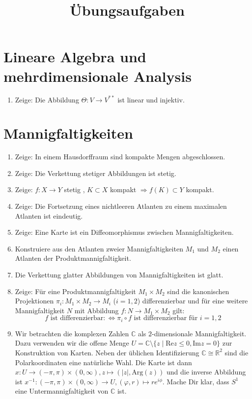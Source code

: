 \documentclass[a4paper]{scrartcl}
\title{Übungsaufgaben}
\newcommand{\R}{\mathbb{R}}
\begin{document}
	\maketitle
\setcounter{section}{-1}
	\section{Lineare Algebra und mehrdimensionale Analysis}
	\begin{enumerate}
		\item Zeige: Die Abbildung $\Theta\colon V\rightarrow V^{**}$ ist linear und injektiv.
	\end{enumerate}
	\section{Mannigfaltigkeiten}
	\begin{enumerate}
		\item Zeige: In einem Hausdorffraum sind kompakte Mengen abgeschlossen.
		\item Zeige: Die Verkettung stetiger Abbildungen ist stetig.
		\item Zeige: $f\colon X\rightarrow Y$ stetig , $K\subset X$ kompakt $\Rightarrow f(K)\subset Y$ kompakt.
		\item Zeige: Die Fortsetzung eines nichtleeren Atlanten zu einem maximalen Atlanten ist eindeutig.
		\item Zeige: Eine Karte ist ein Diffeomorphismus zwischen Mannigfaltigkeiten.
		\item Konstruiere aus den Atlanten zweier Mannigfaltigkeiten $M_1$ und $M_2$ einen Atlanten der Produktmannigfaltigkeit.
		\item Die Verkettung glatter Abbildungen von Mannigfaltigkeiten ist glatt.
		\item Zeige: Für eine Produktmannigfaltigkeit $M_1\times M_2$ sind die kanonischen Projektionen $\pi_i\colon M_1\times M_2\rightarrow M_i$ ($i=1,2$) differenzierbar und für eine weitere Mannigfaltigkeit $N$ mit Abbildung $f\colon N\rightarrow M_1\times M_2$ gilt:
		\begin{equation}
			\text{$f$ ist differenzierbar} \colon\Leftrightarrow \pi_i\circ f \text{ ist differenzierbar für } i=1,2
		\end{equation}
		\item Wir betrachten die komplexen Zahlen $\mathbb{C}$ als $2$-dimensionale Mannigfaltigkeit. Dazu verwenden wir die offene Menge $U=\mathbb{C}\setminus\{z\mid \mathrm{Re}z\leq 0, \mathrm{Im}z=0\}$ zur Konstruktion von Karten. Neben der üblichen Identifizierung $\mathbb{C}\cong\R^2$ sind die Polarkoordinaten eine natürliche Wahl. Die Karte ist dann $x\colon U\rightarrow (-\pi,\pi)\times (0,\infty), z\mapsto (\lvert z\rvert, \mathrm{Arg}(z))$ und die inverse Abbildung ist $x^{-1}\colon (-\pi,\pi)\times (0,\infty)\rightarrow U, (\varphi,r)\mapsto re^{i\phi}$. Mache Dir klar, dass $S^1$ eine Untermannigfaltigkeit von $\mathbb{C}$ ist.
	\end{enumerate}
\end{document}
